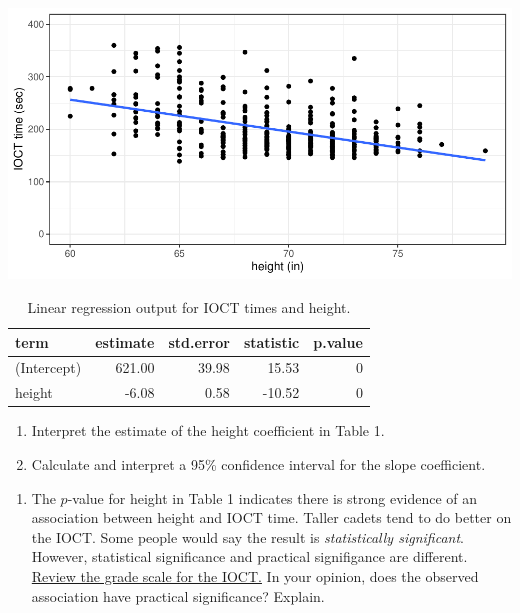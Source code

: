 \documentclass[
]{book}
\providecommand{\tightlist}{%
  \setlength{\itemsep}{0pt}\setlength{\parskip}{0pt}}
\begin{document}
\includegraphics{MA206supplement_files/figure-latex/unnamed-chunk-2-1.pdf}

\begin{table}

\caption{\label{tab:unnamed-chunk-2}Linear regression output for IOCT times and height.}
\centering
\begin{tabular}[t]{l|r|r|r|r}
\hline
term & estimate & std.error & statistic & p.value\\
\hline
(Intercept) & 621.00 & 39.98 & 15.53 & 0\\
\hline
height & -6.08 & 0.58 & -10.52 & 0\\
\hline
\end{tabular}
\end{table}

\begin{enumerate}
\def\labelenumi{\arabic{enumi}.}
\setcounter{enumi}{4}
\item
  Interpret the estimate of the height coefficient in Table 1.

  \vspace{1in}
\item
  Calculate and interpret a 95\% confidence interval for the slope coefficient.
\end{enumerate}

\vspace{1in}

\newpage

\begin{enumerate}
\def\labelenumi{\arabic{enumi}.}
\setcounter{enumi}{6}
\tightlist
\item
  The \(p\)-value for height in Table 1 indicates there is strong evidence of an association between height and IOCT time. Taller cadets tend to do better on the IOCT. Some people would say the result is \emph{statistically significant}. However, statistical significance and practical signifigance are different. \href{https://en.wikipedia.org/wiki/Indoor_Obstacle_Course_Test}{Review the grade scale for the IOCT.} In your opinion, does the observed association have practical significance? Explain.
\end{enumerate}
\end{document}
